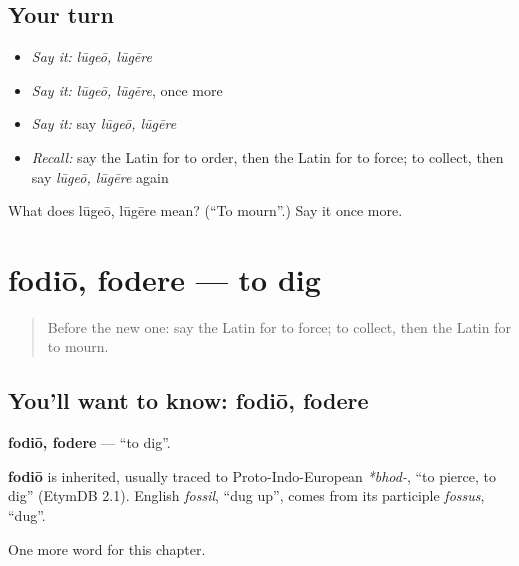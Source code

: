 \subsection*{Your turn}
\begin{itemize}
\raggedright
  \item \emph{Say it:} \emph{lūgeō, lūgēre}
  \item \emph{Say it:} \emph{lūgeō, lūgēre}, once more
  \item \emph{Say it:} say \emph{lūgeō, lūgēre}
  \item \emph{Recall:} say the Latin for to order, then the Latin for to force; to collect, then say \emph{lūgeō, lūgēre} again
\end{itemize}

\begin{tcolorbox}[breakable,colback=teal!4,colframe=teal!35!black,title={Before you move on}]
What does lūgeō, lūgēre mean? (\textquotedblleft{}To mourn\textquotedblright{}.) Say it once more.
\end{tcolorbox}
\section[fodiō, fodere]{fodiō, fodere — to dig}

\label{lesson:LA-C261-fodio}



\begin{quote}
Before the new one: say the Latin for to force; to collect, then the Latin for to mourn.
\end{quote}

\subsection*{You'll want to know: fodiō, fodere}
\textbf{fodiō, fodere} — \textquotedblleft{}to dig\textquotedblright{}.

\begin{cousinweb}
\textbf{fodiō} is inherited, usually traced to Proto-Indo-European \emph{*bhod-}, \textquotedblleft{}to pierce, to dig\textquotedblright{} (EtymDB 2.1). English \emph{fossil}, \textquotedblleft{}dug up\textquotedblright{}, comes from its participle \emph{fossus}, \textquotedblleft{}dug\textquotedblright{}.
\end{cousinweb}

\begin{grammarlens}[title={What you've built}]
One more word for this chapter.
\end{grammarlens}

